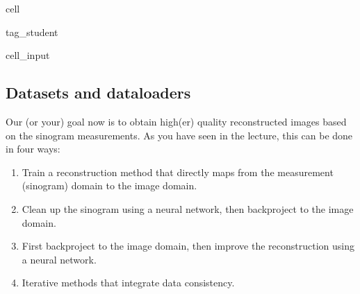 \documentclass[letterpaper,10pt,english]{jupyterBook}
\begin{document}
\begin{sphinxuseclass}{cell}
\begin{sphinxuseclass}{tag_student}\begin{sphinxVerbatimInput}

\begin{sphinxuseclass}{cell_input}
\begin{sphinxVerbatim}[commandchars=\\\{\}]
   

  
\end{sphinxVerbatim}

\end{sphinxuseclass}\end{sphinxVerbatimInput}

\end{sphinxuseclass}
\end{sphinxuseclass}

\subsection{Datasets and dataloaders}
\label{\detokenize{notebooks/Tutorial5_Reconstruction/Tutorial5_Reconstruction_student:datasets-and-dataloaders}}
\sphinxAtStartPar
Our (or your) goal now is to obtain high(er) quality reconstructed images based on the sinogram measurements. As you have seen in the lecture, this can be done in four ways:
\begin{enumerate}
%
\item {} 
\sphinxAtStartPar
Train a reconstruction method that directly maps from the measurement (sinogram) domain to the image domain.

\item {} 
\sphinxAtStartPar
{} Clean up the sinogram using a neural network, then backproject to the image domain.

\item {} 
\sphinxAtStartPar
{} First backproject to the image domain, then improve the reconstruction using a neural network.

\item {} 
\sphinxAtStartPar
Iterative methods that integrate data consistency.

\end{enumerate}
\end{document}
